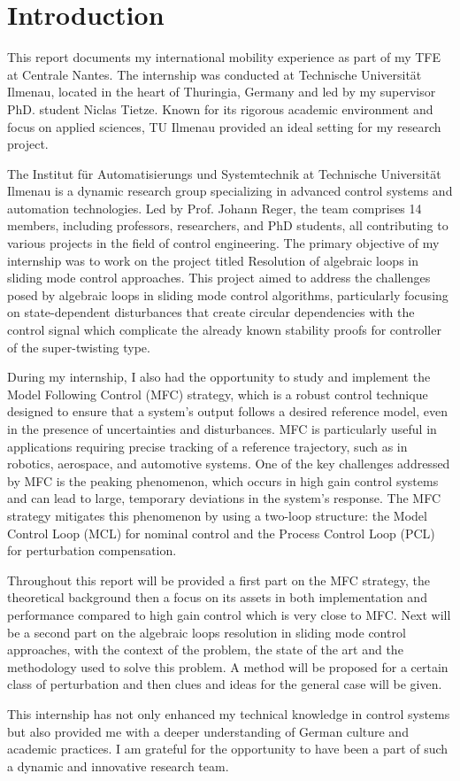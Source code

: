 \chapter{Introduction}

This report documents my international mobility experience as part of my 
TFE at Centrale Nantes. The internship was conducted at Technische 
Universität Ilmenau, located in the heart of Thuringia, Germany and led 
by my supervisor PhD. student Niclas Tietze. 
Known for its rigorous academic environment and focus on applied sciences, 
TU Ilmenau provided an ideal setting for my research project.

The Institut für Automatisierungs und Systemtechnik at Technische 
Universität Ilmenau is a dynamic research group specializing in 
advanced control systems and automation technologies. Led by Prof. 
Johann Reger, the team comprises 14 members, including professors, 
researchers, and PhD students, all contributing to various projects in 
the field of control engineering. The primary objective of my internship 
was to work on the project titled Resolution of algebraic loops 
in sliding mode control approaches. This project aimed to address the 
challenges posed by algebraic loops in sliding mode control algorithms, 
particularly focusing on state-dependent disturbances that create circular 
dependencies with the control signal which complicate the already known
stability proofs for controller of the super-twisting type.

During my internship, I also had the opportunity to study and implement 
the Model Following Control (MFC) strategy, which is a robust control 
technique designed to ensure that a system's output follows a desired 
reference model, even in the presence of uncertainties and disturbances. 
MFC is particularly useful in applications requiring precise tracking of 
a reference trajectory, such as in robotics, aerospace, and automotive 
systems. One of the key challenges addressed by MFC is the peaking 
phenomenon, which occurs in high gain control systems and can lead to 
large, temporary deviations in the system's response. The MFC strategy 
mitigates this phenomenon by using a two-loop structure: the Model Control 
Loop (MCL) for nominal control and the Process Control Loop (PCL) for 
perturbation compensation.

Throughout this report will be provided a first part on the MFC strategy, the 
theoretical background then a focus on its assets in both implementation and 
performance compared to high gain control which is very close to MFC.
Next will be a second part on the algebraic loops resolution in sliding mode
control approaches, with the context of the problem, the state of the art
and the methodology used to solve this problem. A method will be proposed 
for a certain class of perturbation and then clues and ideas for the
general case will be given.

This internship has not only enhanced my technical knowledge in control 
systems but also provided me with a deeper understanding of German culture 
and academic practices. I am grateful for the opportunity to have been a 
part of such a dynamic and innovative research team.
